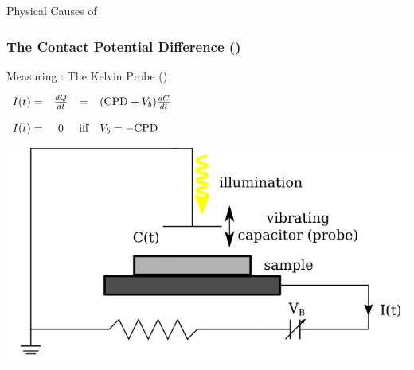 \documentclass{beamer}
\begin{document}
\begin{frame}
\begin{block}{Physical Causes of \cpd{}}
\begin{minipage}{0.55\linewidth}
	
\end{minipage}
\end{block}\end{frame}


\begin{frame}
\frametitle{The Contact Potential Difference (\cpd{})}
\begin{block}{Measuring \cpd{}: The Kelvin Probe (\kp{})}
\centering
\begin{minipage}{0.45\linewidth}
\centering
$\begin{array}{l c c l}
I(t) 	=& \frac{dQ}{dt}	&=& (\text{CPD}{}+V_b) \frac{dC}{dt}	\\
		& 				& &								\\
I(t)		=& 0				&\text{iff}&	V_b=-\text{CPD}{}			\end{array}$
\end{minipage}
\hfill
\begin{minipage}{0.5\linewidth}
\centering
	\includegraphics[width=1\linewidth]{./figs/pres/simple-kp-scheme}\\
\end{minipage}
\end{block}\end{frame}
\end{document}
